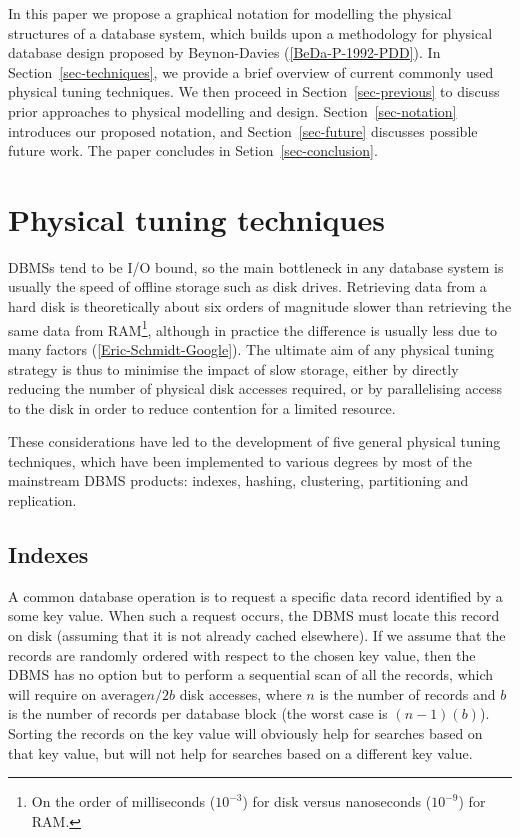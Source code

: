 \documentclass{llncs}
\begin{document}
In this paper we propose a graphical notation for modelling the physical structures of a database system, which builds upon a methodology for physical database design proposed by Beynon-Davies (\ref{BeDa-P-1992-PDD}). In Section~\ref{sec-techniques}, we provide a brief overview of current commonly used physical tuning techniques. We then proceed in Section~\ref{sec-previous} to discuss prior approaches to physical modelling and design. Section~\ref{sec-notation} introduces our proposed notation, and Section~\ref{sec-future} discusses possible future work. The paper concludes in Setion~\ref{sec-conclusion}.


\section{Physical tuning techniques}

DBMSs tend to be I/O bound, so the main bottleneck in any database system is usually the speed of offline storage such as disk drives. Retrieving data from a hard disk is theoretically about six orders of magnitude slower than retrieving the same data from RAM\footnote{On the order of milliseconds (\(10^{-3}\)) for disk versus nanoseconds (\(10^{-9}\)) for RAM.}, although in practice the difference is usually less due to many factors (\ref{Eric-Schmidt-Google}). The ultimate aim of any physical tuning strategy is thus to minimise the impact of slow storage, either by directly reducing the number of physical disk accesses required, or by parallelising access to the disk in order to reduce contention for a limited resource.

These considerations have led to the development of five general physical tuning techniques, which have been implemented to various degrees by most of the mainstream DBMS products: indexes, hashing, clustering, partitioning and replication.

\subsection{Indexes}

A common database operation is to request a specific data record identified by a some key value. When such a request occurs, the DBMS must locate this record on disk (assuming that it is not already cached elsewhere). If we assume that the records are randomly ordered with respect to the chosen key value, then the DBMS has no option but to perform a sequential scan of all the records, which will require on average\(n/2b\) disk accesses, where \(n\) is the number of records and \(b\) is the number of records per database block (the worst case is \((n - 1)(b)\)). Sorting the records on the key value will obviously help for searches based on that key value, but will not help for searches based on a different key value.
\end{document}
